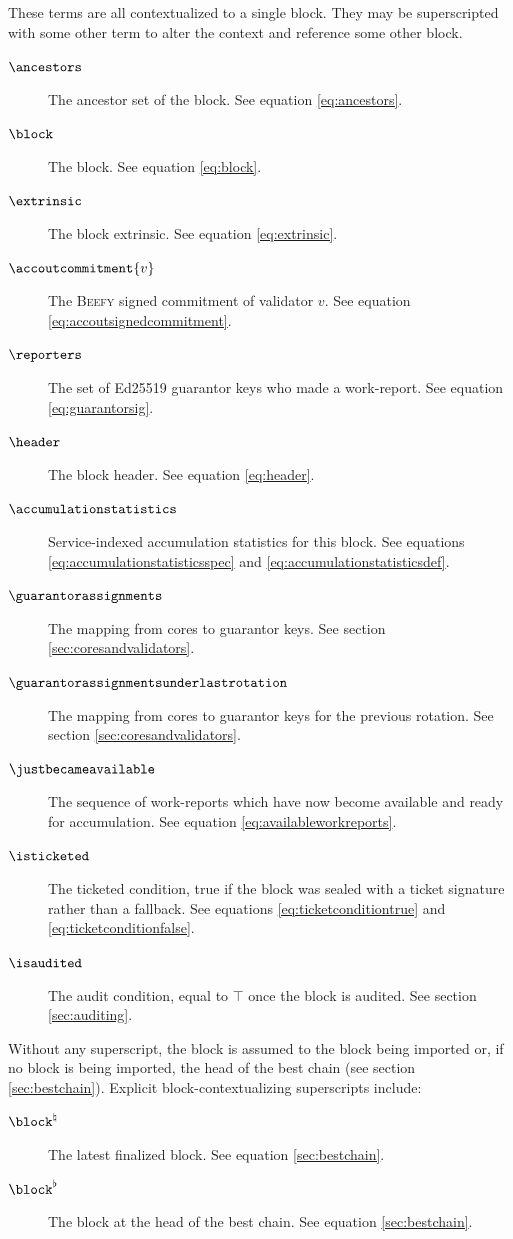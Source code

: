 These terms are all contextualized to a single block. They may be superscripted with some other term to alter the context and reference some other block.
\begin{description}
  \item[$\ancestors$] The ancestor set of the block. See equation \ref{eq:ancestors}.
  \item[$\block$] The block. See equation \ref{eq:block}.
  \item[$\extrinsic$] The block extrinsic. See equation \ref{eq:extrinsic}.
  \item[$\accoutcommitment{v}$] The \textsc{Beefy} signed commitment of validator $v$. See equation \ref{eq:accoutsignedcommitment}.
  \item[$\reporters$] The set of Ed25519 guarantor keys who made a work-report. See equation \ref{eq:guarantorsig}.
  \item[$\header$] The block header. See equation \ref{eq:header}.
  \item[$\accumulationstatistics$] Service-indexed accumulation statistics for this block. See equations \ref{eq:accumulationstatisticsspec} and \ref{eq:accumulationstatisticsdef}.
  \item[$\guarantorassignments$] The mapping from cores to guarantor keys. See section \ref{sec:coresandvalidators}.
  \item[$\guarantorassignmentsunderlastrotation$] The mapping from cores to guarantor keys for the previous rotation. See section \ref{sec:coresandvalidators}.
  \item[$\justbecameavailable$] The sequence of work-reports which have now become available and ready for accumulation. See equation \ref{eq:availableworkreports}.
  \item[$\isticketed$] The ticketed condition, true if the block was sealed with a ticket signature rather than a fallback. See equations \ref{eq:ticketconditiontrue} and \ref{eq:ticketconditionfalse}.
  \item[$\isaudited$] The audit condition, equal to $\top$ once the block is audited. See section \ref{sec:auditing}.
\end{description}

Without any superscript, the block is assumed to the block being imported or, if no block is being imported, the head of the best chain (see section \ref{sec:bestchain}). Explicit block-contextualizing superscripts include:
\begin{description}
  \item[$\block^\natural$] The latest finalized block. See equation \ref{sec:bestchain}.
  \item[$\block^\flat$] The block at the head of the best chain. See equation \ref{sec:bestchain}.
\end{description}

